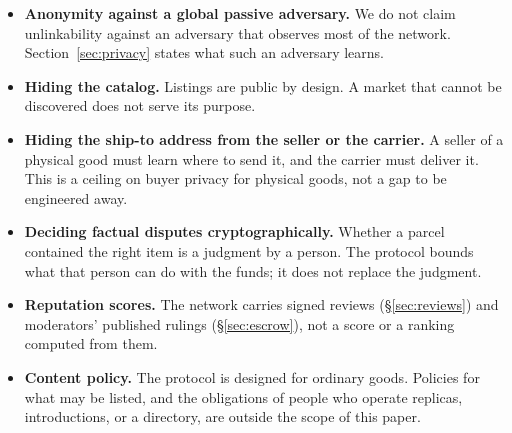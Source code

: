 \begin{itemize}
  \item \textbf{Anonymity against a global passive adversary.} We do not claim unlinkability against an adversary that observes most of the network. Section~\ref{sec:privacy} states what such an adversary learns.
  \item \textbf{Hiding the catalog.} Listings are public by design. A market that cannot be discovered does not serve its purpose.
  \item \textbf{Hiding the ship-to address from the seller or the carrier.} A seller of a physical good must learn where to send it, and the carrier must deliver it. This is a ceiling on buyer privacy for physical goods, not a gap to be engineered away.
  \item \textbf{Deciding factual disputes cryptographically.} Whether a parcel contained the right item is a judgment by a person. The protocol bounds what that person can do with the funds; it does not replace the judgment.
  \item \textbf{Reputation scores.} The network carries signed reviews (\S\ref{sec:reviews}) and moderators' published rulings (\S\ref{sec:escrow}), not a score or a ranking computed from them.
  \item \textbf{Content policy.} The protocol is designed for ordinary goods. Policies for what may be listed, and the obligations of people who operate replicas, introductions, or a directory, are outside the scope of this paper.
\end{itemize}
